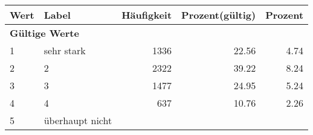      \begin{longtable}{lXrrr}
     \toprule
     \textbf{Wert} & \textbf{Label} & \textbf{Häufigkeit} & \textbf{Prozent(gültig)} & \textbf{Prozent} \\
     \endhead
     \midrule
     \multicolumn{5}{l}{\textbf{Gültige Werte}}\\

     1 &
     \multicolumn{1}{X}{ sehr stark   } &


       \num{1336} &
       \num[round-mode=places,round-precision=2]{22.56} &
         \num[round-mode=places,round-precision=2]{4.74} \\

     2 &
     \multicolumn{1}{X}{ 2   } &


       \num{2322} &
       \num[round-mode=places,round-precision=2]{39.22} &
         \num[round-mode=places,round-precision=2]{8.24} \\

     3 &
     \multicolumn{1}{X}{ 3   } &


       \num{1477} &
       \num[round-mode=places,round-precision=2]{24.95} &
         \num[round-mode=places,round-precision=2]{5.24} \\

     4 &
     \multicolumn{1}{X}{ 4   } &


       \num{637} &
       \num[round-mode=places,round-precision=2]{10.76} &
         \num[round-mode=places,round-precision=2]{2.26} \\

     5 &
     \multicolumn{1}{X}{ überhaupt nicht   } &



\end{longtable}
